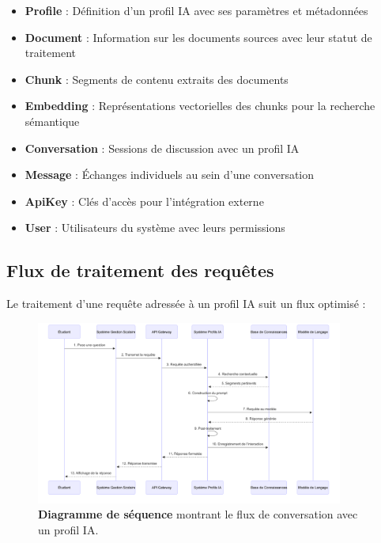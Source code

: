 \begin{itemize}
  \item \textbf{Profile} : Définition d'un profil IA avec ses paramètres et métadonnées
  
  \item \textbf{Document} : Information sur les documents sources avec leur statut de traitement
  
  \item \textbf{Chunk} : Segments de contenu extraits des documents
  
  \item \textbf{Embedding} : Représentations vectorielles des chunks pour la recherche sémantique
  
  \item \textbf{Conversation} : Sessions de discussion avec un profil IA
  
  \item \textbf{Message} : Échanges individuels au sein d'une conversation
  
  \item \textbf{ApiKey} : Clés d'accès pour l'intégration externe
  
  \item \textbf{User} : Utilisateurs du système avec leurs permissions
\end{itemize}

\subsection{Flux de traitement des requêtes}

Le traitement d'une requête adressée à un profil IA suit un flux optimisé :

\begin{figure}[H]
  \centering
  \includegraphics[width=0.9\textwidth,keepaspectratio]{pfe-pics/diagrames/Flux de Conversation IA (AI Conversation Flow).png}
  \caption{\textbf{Diagramme de séquence} montrant le flux de conversation avec un profil IA.}
  \label{fig:ai_conversation_flow}
\end{figure}


